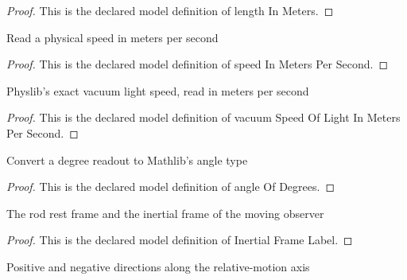 \begin{proof}
  This is the declared model definition of length In Meters.
\end{proof}
\begin{definition}
  \label{def:physics:phyx-mini-0650:phyxminiproblems-problemphyxmini0650-speedinmeterspersecond}
  Read a physical speed in meters per second
\end{definition}
\begin{proof}
  This is the declared model definition of speed In Meters Per Second.
\end{proof}
\begin{definition}
  \label{def:physics:phyx-mini-0650:phyxminiproblems-problemphyxmini0650-vacuumspeedoflightinmeterspersecond}
  Physlib's exact vacuum light speed, read in meters per second
\end{definition}
\begin{proof}
  This is the declared model definition of vacuum Speed Of Light In Meters Per Second.
\end{proof}
\begin{definition}
  \label{def:physics:phyx-mini-0650:phyxminiproblems-problemphyxmini0650-angleofdegrees}
  Convert a degree readout to Mathlib's angle type
\end{definition}
\begin{proof}
  This is the declared model definition of angle Of Degrees.
\end{proof}
\begin{definition}
  \label{def:physics:phyx-mini-0650:phyxminiproblems-problemphyxmini0650-inertialframelabel}
  The rod rest frame and the inertial frame of the moving observer
\end{definition}
\begin{proof}
  This is the declared model definition of Inertial Frame Label.
\end{proof}
\begin{definition}
  \label{def:physics:phyx-mini-0650:phyxminiproblems-problemphyxmini0650-axialdirection}
  Positive and negative directions along the relative-motion axis
\end{definition}
